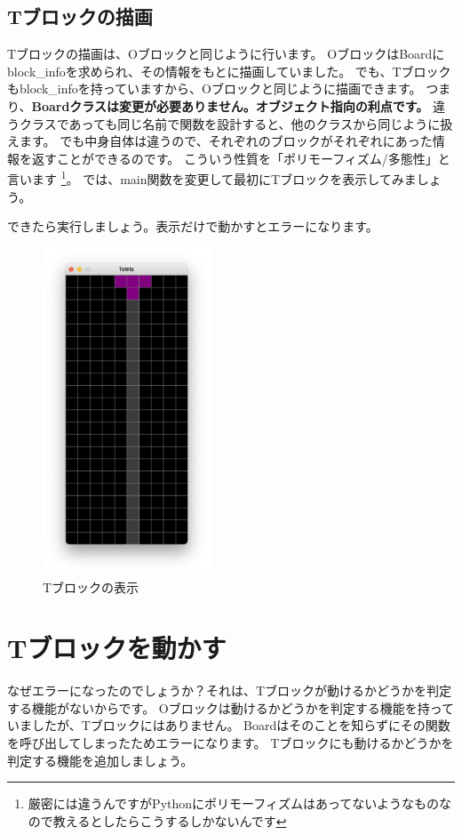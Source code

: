 \documentclass[12pt, a4paper, dvipdfmx]{book}
\begin{document}
\subsection{Tブロックの描画}
Tブロックの描画は、Oブロックと同じように行います。
OブロックはBoardにblock\_infoを求められ、その情報をもとに描画していました。
でも、Tブロックもblock\_infoを持っていますから、Oブロックと同じように描画できます。
つまり、\textbf{Boardクラスは変更が必要ありません。オブジェクト指向の利点です。}
違うクラスであっても同じ名前で関数を設計すると、他のクラスから同じように扱えます。
でも中身自体は違うので、それぞれのブロックがそれぞれにあった情報を返すことができるのです。
こういう性質を「ポリモーフィズム/多態性」と言います
\footnote{厳密には違うんですがPythonにポリモーフィズムはあってないようなものなので教えるとしたらこうするしかないんです}。
では、main関数を変更して最初にTブロックを表示してみましょう。

できたら実行しましょう。表示だけで動かすとエラーになります。
\begin{figure}[h]
  \centering
  \includegraphics[width=50mm]{CH7_2.png}
  \caption{Tブロックの表示}
\end{figure}

\section{Tブロックを動かす}
なぜエラーになったのでしょうか？それは、Tブロックが動けるかどうかを判定する機能がないからです。
Oブロックは動けるかどうかを判定する機能を持っていましたが、Tブロックにはありません。
Boardはそのことを知らずにその関数を呼び出してしまったためエラーになります。
Tブロックにも動けるかどうかを判定する機能を追加しましょう。
\end{document}
